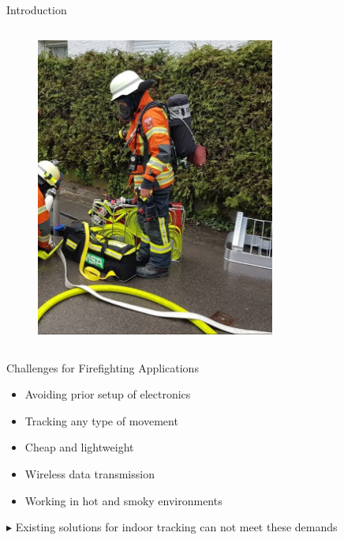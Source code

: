 \documentclass[aspectratio=169]{beamer}
\begin{document}
{\begin{frame}{Introduction}
\begin{columns}
				\begin{figure}
					\centering
					\includegraphics[width=0.7\textwidth]{firefighter.png}
				\end{figure}
	
		\end{columns}
		
		
	\end{frame}
	
	\begin{frame}{Challenges for Firefighting Applications}
		\begin{itemize}
			\item<2-> Avoiding prior setup of electronics
			\item<3-> Tracking any type of movement
			\item<4-> Cheap and lightweight %
			\item<5-> Wireless data transmission %
			\item<6-> Working in hot and smoky environments %
		\end{itemize}
		\pause
		\pause
		\pause
		\pause
		\pause
		\pause
		\begin{block}{$\blacktriangleright$ Existing solutions for indoor tracking can not meet these demands}
			
		\end{block}
		
	\end{frame}
	
}
\end{document}

